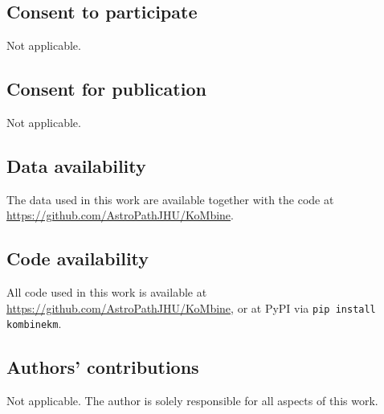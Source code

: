 \documentclass[pdflatex,sn-basic]{sn-jnl}%
\theoremstyle{thmstyleone}%
\theoremstyle{thmstyletwo}%
\theoremstyle{thmstylethree}%
\begin{document}
\subsection*{Consent to participate}
Not applicable.

\subsection*{Consent for publication}
Not applicable.

\subsection*{Data availability}
The data used in this work are available together with the code at \url{https://github.com/AstroPathJHU/KoMbine}.

\subsection*{Code availability}
All code used in this work is available at \url{https://github.com/AstroPathJHU/KoMbine}, or at PyPI via \texttt{pip install kombinekm}.

\subsection*{Authors' contributions}
Not applicable. The author is solely responsible for all aspects of this work.
\end{document}
